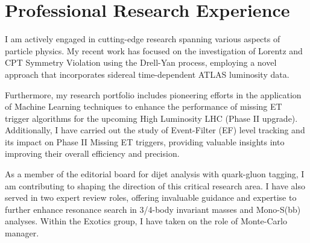 \section{Professional Research Experience}

\begin{cventries}
\end{cventries}
      \vspace{-1cm}
      \parbox{0.9\linewidth}{
      \leftskip=0.5in
       I am actively engaged in cutting-edge research spanning various aspects of particle physics. My recent work has focused on the investigation of Lorentz and CPT Symmetry Violation using the Drell-Yan process, employing a novel approach that incorporates sidereal time-dependent ATLAS luminosity data.

Furthermore, my research portfolio includes pioneering efforts in the application of Machine Learning techniques to enhance the performance of missing ET trigger algorithms for the upcoming High Luminosity LHC (Phase II upgrade). Additionally, I have carried out the study of Event-Filter (EF) level tracking and its impact on Phase II Missing ET triggers, providing valuable insights into improving their overall efficiency and precision.

As a member of the editorial board for dijet analysis with quark-gluon tagging, I am contributing to shaping the direction of this critical research area. I have also served in two expert review roles, offering invaluable guidance and expertise to further enhance resonance search in 3/4-body invariant masses and Mono-S(bb) analyses.\newline
Within the Exotics group, I have taken on the role of Monte-Carlo manager.

        }
 
